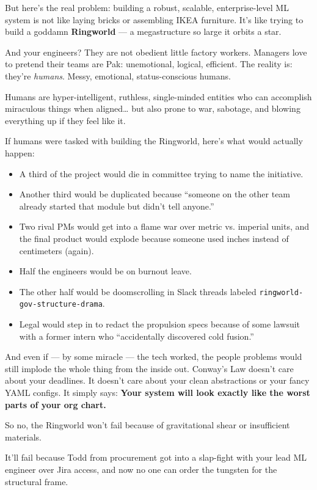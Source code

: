 But here’s the real problem: building a robust, scalable, enterprise-level ML system is not like laying bricks or assembling IKEA furniture. It’s like trying to build a goddamn \textbf{Ringworld} — a megastructure so large it orbits a star.

And your engineers? They are not obedient little factory workers. Managers love to pretend their teams are Pak: unemotional, logical, efficient. The reality is: they’re \textit{humans}. Messy, emotional, status-conscious humans.

Humans are hyper-intelligent, ruthless, single-minded entities who can accomplish miraculous things when aligned… but also prone to war, sabotage, and blowing everything up if they feel like it.

If humans were tasked with building the Ringworld, here’s what would actually happen:

\begin{itemize}
    \item A third of the project would die in committee trying to name the initiative.
    \item Another third would be duplicated because “someone on the other team already started that module but didn’t tell anyone.”
    \item Two rival PMs would get into a flame war over metric vs. imperial units, and the final product would explode because someone used inches instead of centimeters (again).
    \item Half the engineers would be on burnout leave.
    \item The other half would be doomscrolling in Slack threads labeled \texttt{ringworld-gov-structure-drama}.
    \item Legal would step in to redact the propulsion specs because of some lawsuit with a former intern who “accidentally discovered cold fusion.”
\end{itemize}

And even if — by some miracle — the tech worked, the people problems would still implode the whole thing from the inside out. Conway’s Law doesn’t care about your deadlines. It doesn’t care about your clean abstractions or your fancy YAML configs. It simply says:  
\textbf{Your system will look exactly like the worst parts of your org chart.}

So no, the Ringworld won’t fail because of gravitational shear or insufficient materials.

It’ll fail because Todd from procurement got into a slap-fight with your lead ML engineer over Jira access, and now no one can order the tungsten for the structural frame.

